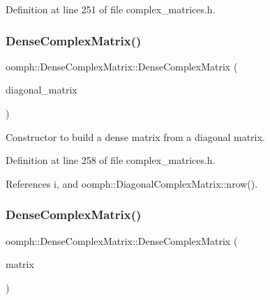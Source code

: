 Definition at line 251 of file complex\+\_\+matrices.\+h.

\mbox{\label{classoomph_1_1DenseComplexMatrix_a4553b48119e3b4dc1070f0ad9ce98e91}} 
\subsubsection{\texorpdfstring{Dense\+Complex\+Matrix()}{DenseComplexMatrix()}\hspace{0.1cm}{\footnotesize\ttfamily [5/6]}}
{\footnotesize\ttfamily oomph\+::\+Dense\+Complex\+Matrix\+::\+Dense\+Complex\+Matrix (\begin{DoxyParamCaption}\item[{const \hyperlink{classoomph_1_1DiagonalComplexMatrix}{Diagonal\+Complex\+Matrix} \&}]{diagonal\+\_\+matrix }\end{DoxyParamCaption})\hspace{0.3cm}{\ttfamily [inline]}}



Constructor to build a dense matrix from a diagonal matrix. 



Definition at line 258 of file complex\+\_\+matrices.\+h.



References i, and oomph\+::\+Diagonal\+Complex\+Matrix\+::nrow().

\mbox{\label{classoomph_1_1DenseComplexMatrix_a45eecfd3892ddb98b3b0b06f1124ae64}} 
\subsubsection{\texorpdfstring{Dense\+Complex\+Matrix()}{DenseComplexMatrix()}\hspace{0.1cm}{\footnotesize\ttfamily [6/6]}}
{\footnotesize\ttfamily oomph\+::\+Dense\+Complex\+Matrix\+::\+Dense\+Complex\+Matrix (\begin{DoxyParamCaption}\item[{const \hyperlink{classoomph_1_1DenseComplexMatrix}{Dense\+Complex\+Matrix} \&}]{matrix }\end{DoxyParamCaption})\hspace{0.3cm}{\ttfamily [inline]}}



